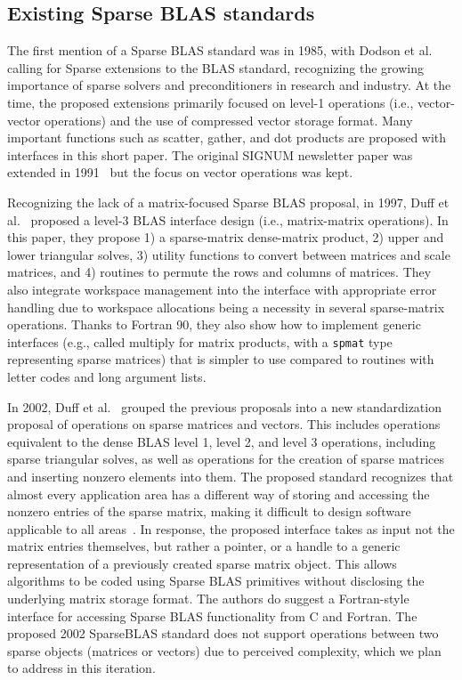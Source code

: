 \documentclass{article}
\begin{document}
\subsection{Existing Sparse BLAS standards}

The first mention of a Sparse BLAS standard was in 1985, with Dodson et
al.~\cite{10.1145/1057935.1057938} calling for Sparse extensions to the BLAS standard, recognizing the growing importance of sparse
solvers and preconditioners in research and industry. At the time, the proposed
extensions primarily focused on level-1 operations (i.e., vector-vector
operations) and the use of compressed vector storage format. Many important
functions such as scatter, gather, and dot products are proposed with interfaces in
this short paper. The original SIGNUM newsletter paper was extended in
1991~\cite{10.1145/108556.108577} but the focus on vector operations was kept.

Recognizing the lack of a matrix-focused Sparse BLAS proposal, in 1997, Duff et
al.~\cite{10.1145/275323.275327} proposed a level-3 BLAS interface design (i.e.,
matrix-matrix operations). In this paper, they propose 1) a sparse-matrix
dense-matrix product, 2) upper and lower triangular solves, 3) utility functions
to convert between matrices and scale matrices, and 4) routines to permute the
rows and columns of matrices. They also integrate workspace management into the
interface with appropriate error handling due to workspace allocations being a
necessity in several sparse-matrix operations. Thanks to Fortran 90, they also
show how to implement generic interfaces (e.g., called multiply for matrix
products, with a \texttt{spmat} type representing sparse matrices) that is simpler
to use compared to routines with letter codes and long argument lists.

In 2002, Duff et al.~\cite{10.1145/567806.567810} grouped the previous
proposals into a new standardization proposal of operations on sparse matrices
and vectors. This includes operations equivalent to the dense BLAS level 1, level 2, and level 3 operations, including sparse triangular solves, as well as operations for the creation of sparse matrices and inserting nonzero
elements into them. The proposed standard recognizes that almost
every application area has a different way of storing and accessing the nonzero
entries of the sparse matrix, making it difficult to design software applicable to
all areas~\cite{10.1145/567806.567810}. In response, the proposed interface takes
as input not the matrix entries themselves, but rather a pointer, or a handle to
a generic representation of a previously created sparse matrix object. This
allows algorithms to be coded using Sparse BLAS primitives without disclosing
the underlying matrix storage format. The authors do suggest a Fortran-style
interface for accessing Sparse BLAS functionality from C and Fortran.  The
proposed 2002 SparseBLAS standard does not support operations between two sparse
objects (matrices or vectors) due to perceived complexity, which we plan to
address in this iteration.
\end{document}
